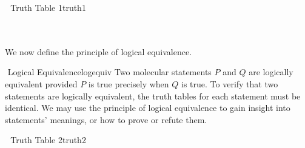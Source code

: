 \begin{example}{\Difficulty\,\Difficulty\,\Difficulty\,\,Truth Table 1}{truth1}
        \end{example}
        \vphantom
        \\
        \\
        We now define the principle of logical equivalence.
        \begin{definition}{\Stop\,\,Logical Equivalence}{logequiv}
            Two molecular statements \(P\) and \(Q\) are logically equivalent provided \(P\) is true precisely when \(Q\) is true. To verify that two statements are logically equivalent, the truth tables for each statement must be identical. We may use the principle of logical equivalence to gain insight into statements' meanings, or how to prove or refute them.
        \end{definition}
        \pagebreak
        \begin{example}{\Difficulty\,\Difficulty\,\Difficulty\,\,Truth Table 2}{truth2}
        

\end{example}

